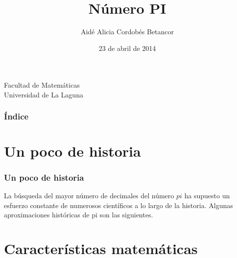 \documentclass{beamer}
\begin{document}
\title[Presentación del número PI]{Número PI}
\author[Aidé Alicia Cordobés Betancor]{Aidé Alicia Cordobés Betancor}
\date[23-04-2014]{23 de abril de 2014}


  
\begin{frame}
\titlepage
  \begin{small}
    \begin{center}
     Facultad de Matemáticas \\
     Universidad de La Laguna
    \end{center}
  \end{small}

\end{frame}

\begin{frame}
  \frametitle{Índice}
  \tableofcontents[pausesections]
\end{frame}


\section{Un poco de historia}


\begin{frame}

\frametitle{Un poco de historia}
La búsqueda del mayor número de decimales
del número $pi$ ha supuesto un esfuerzo constante
de numerosos científicos a lo largo de la historia.
Algunas aproximaciones históricas de pi son las
siguientes.

\end{frame}

\section{Características matemáticas}
\end{document}
